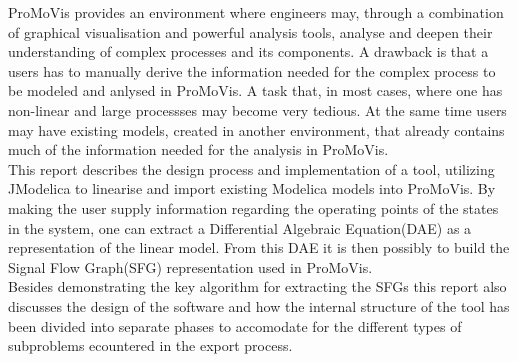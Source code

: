 ProMoVis provides an environment where engineers may, through a combination of graphical visualisation and powerful analysis tools, analyse and deepen their understanding of complex processes and its components. A drawback is that a users has to manually derive the information needed for the complex process to be modeled and anlysed in ProMoVis. A task that, in most cases, where one has non-linear and large processses may become very tedious. At the same time users may have existing models, created in another environment, that already contains much of the information needed for the analysis in ProMoVis.\\\newline This report describes the design process and implementation of a tool, utilizing JModelica to linearise and import existing Modelica models into ProMoVis. By making the user supply information regarding the operating points of the states in the system, one can extract a Differential Algebraic Equation(DAE) as a representation of the linear model. From this DAE it is then possibly to build the Signal Flow Graph(SFG) representation used in ProMoVis.\\\newline Besides demonstrating the key algorithm for extracting the SFGs this report also discusses the design of the software and how the internal structure of the tool has been divided into separate phases to accomodate for the different types of subproblems ecountered in the export process. 

